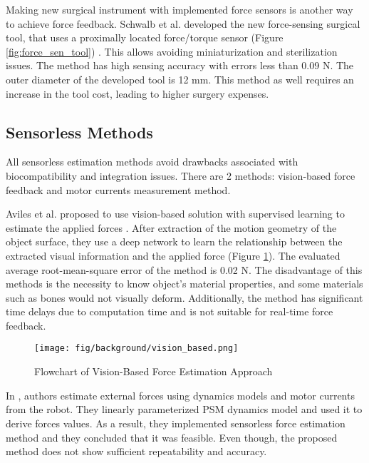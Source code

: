 Making new surgical instrument with implemented force sensors is another way to achieve force feedback. Schwalb et al. developed the new force-sensing surgical tool, that uses a proximally located force/torque sensor (Figure \ref{fig:force_sen_tool}) \cite{schwalb_forcesensing_2017}. This allows avoiding miniaturization and sterilization issues. The method has high sensing accuracy with errors less than 0.09 N. The outer diameter of the developed tool is 12 mm. This method as well requires an increase in the tool cost, leading to higher surgery expenses.

\subsection{Sensorless Methods}

All sensorless estimation methods avoid drawbacks associated with biocompatibility and integration issues. There are 2 methods: vision-based force feedback and motor currents measurement method.

Aviles et al. proposed to use vision-based solution with supervised learning to estimate the applied forces \cite{aviles_towards_2017}. After extraction of the motion geometry of the object surface, they use a deep network to learn the relationship between the extracted visual information and the applied force (Figure \ref{fig:visual_appr}). The evaluated average root-mean-square error of the method is 0.02 N.  The disadvantage of this methods is the necessity to know object's material properties, and some materials such as bones would not visually deform. Additionally, the method has significant time delays due to computation time and is not suitable for real-time force feedback. 

\begin{figure}[h]
	\begin{center}
	\texttt{[image: fig/background/vision\_based.png]}
	\end{center}
	\vspace{-4mm}
	\caption[Flowchart of Vision-Based Force Estimation Approach]
	{Flowchart of Vision-Based Force Estimation Approach \cite{aviles_towards_2017}}
	\label{fig:visual_appr}
	\vspace{-2mm}
\end{figure}

In \cite{sang_hongqiang_external_2017, yoon_design_2015}, authors estimate external forces using dynamics models and motor currents from the robot. They linearly parameterized PSM dynamics model and used it to derive forces values. As a result, they implemented sensorless force estimation method and they concluded that it was feasible. Even though, the proposed method does not show sufficient repeatability and accuracy.


